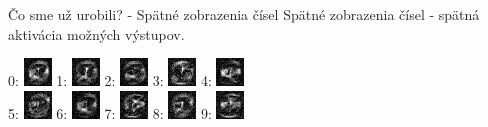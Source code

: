 \documentclass[xcolor=dvipsnames]{beamer}
\begin{document}
\begin{frame}{Čo sme už urobili? - Spätné zobrazenia čísel}
  Spätné zobrazenia čísel - spätná aktivácia možných výstupov.

  \begin{center}
    0:
    \includegraphics[scale=1]{img/dig_0.png}
    1:
    \includegraphics[scale=1]{img/dig_1.png}
    2:
    \includegraphics[scale=1]{img/dig_2.png}
    3:
    \includegraphics[scale=1]{img/dig_3.png}
    4:
    \includegraphics[scale=1]{img/dig_4.png}
    \\
    5:
    \includegraphics[scale=1]{img/dig_5.png}
    6:
    \includegraphics[scale=1]{img/dig_6.png}
    7:
    \includegraphics[scale=1]{img/dig_7.png}
    8:
    \includegraphics[scale=1]{img/dig_8.png}
    9:
    \includegraphics[scale=1]{img/dig_9.png}
  \end{center}
  
  
\end{frame}
\end{document}
